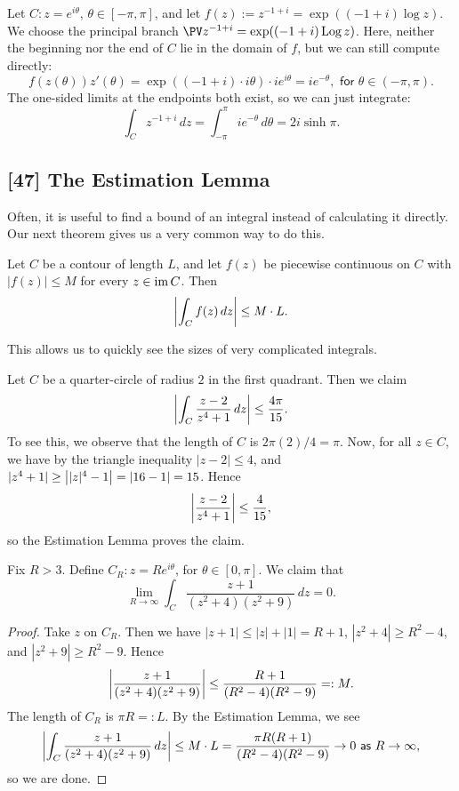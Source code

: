 \documentclass{article}
\begin{document}
\newpage
\begin{example}
Let $C: z = e^{i\theta}$, $\theta\in [-\pi, \pi]$, and let $f(z) := z^{-1+i} = \exp((-1+i)\log z)$. We choose the principal branch $\PV z^{-1+i} = \exp((-1 + i)\Log z)$. Here, neither the beginning nor the end of $C$ lie in the domain of $f$, but we can still compute directly:
$$f(z(\theta))z'(\theta) = \exp((-1 + i)\cdot i\theta) \cdot ie^{i\theta} = ie^{-\theta}, \textsf{ for } \theta\in (-\pi, \pi).$$
The one-sided limits at the endpoints both exist, so we can just integrate:
$$\int_C z^{-1+i}\, dz = \int_{-\pi}^\pi ie^{-\theta}\, d\theta = \boxed{2i\sinh \pi}.$$
\end{example}
\subsection*{[47] The Estimation Lemma}
Often, it is useful to find a bound of an integral instead of calculating it directly. Our next theorem gives us a very common way to do this.
\begin{theorem}
Let $C$ be a contour of length $L$, and let $f(z)$ be piecewise continuous on $C$ with $|f(z)|\leq M$ for every $z\in \operatorname{im} C$. Then
$$\left|\int_C f(z)\, dz\right| \leq M\cdot L.$$
\end{theorem}
This allows us to quickly see the sizes of very complicated integrals.
\begin{example}
Let $C$ be a quarter-circle of radius $2$ in the first quadrant. Then we claim
$$\left|\int_C \frac{z-2}{z^4+1}\, dz\right| \leq \frac{4\pi}{15}.$$
To see this, we observe that the length of $C$ is $2\pi(2)/4=  \pi$. Now, for all $z\in C$, we have by the triangle inequality $|z-2|\leq 4$, and  $|z^4+1| \geq \left||z|^4 - 1\right| = |16-1| = 15$. Hence
$$\left|\frac{z-2}{z^4+1}\right| \leq \frac 4{15},$$
so the Estimation Lemma proves the claim.
\end{example}
\begin{example}
Fix $R > 3$. Define $C_R: z= Re^{i\theta}$, for $\theta\in[0, \pi]$. We claim that
$$\lim_{R\to\infty} \int_C \frac{z+1}{(z^2+4)(z^2+9)}\, dz = 0.$$
\begin{proof}
Take $z$ on $C_R$. Then we have $|z+1| \leq |z|+|1| = R+1$, $|z^2+4| \geq R^2-4$, and $|z^2+9|\geq R^2-9$. Hence
$$\left|\frac{z+1}{(z^2+4)(z^2+9)}\right| \leq \frac{R+1}{(R^2-4)(R^2-9)} =: M.$$
The length of $C_R$ is $\pi R =: L$. By the Estimation Lemma, we see
$$\left|\int_C \frac{z+1}{(z^2+4)(z^2 + 9)}\, dz\right| \leq M\cdot L = \frac{\pi R(R+1)}{(R^2-4)(R^2-9)}\to 0 \textsf{ as } R\to\infty,$$
so we are done.
\end{proof}
\end{example}
\end{document}
